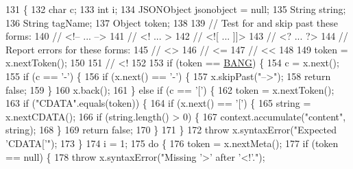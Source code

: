 \begin{DoxyCode}
131                                                                    \{
132         \textcolor{keywordtype}{char}       c;
133         \textcolor{keywordtype}{int}        i;
134         JSONObject jsonobject = null;
135         String     string;
136         String     tagName;
137         Object     token;
138 
139 \textcolor{comment}{// Test for and skip past these forms:}
140 \textcolor{comment}{//      <!-- ... -->}
141 \textcolor{comment}{//      <!   ...   >}
142 \textcolor{comment}{//      <![  ... ]]>}
143 \textcolor{comment}{//      <?   ...  ?>}
144 \textcolor{comment}{// Report errors for these forms:}
145 \textcolor{comment}{//      <>}
146 \textcolor{comment}{//      <=}
147 \textcolor{comment}{//      <<}
148 
149         token = x.nextToken();
150 
151 \textcolor{comment}{// <!}
152 
153         \textcolor{keywordflow}{if} (token == \hyperlink{classorg_1_1json_1_1_x_m_l_a15eadac312b9e5b2d8590be2d92cc24f}{BANG}) \{
154             c = x.next();
155             \textcolor{keywordflow}{if} (c == \textcolor{charliteral}{'-'}) \{
156                 \textcolor{keywordflow}{if} (x.next() == \textcolor{charliteral}{'-'}) \{
157                     x.skipPast(\textcolor{stringliteral}{"-->"});
158                     \textcolor{keywordflow}{return} \textcolor{keyword}{false};
159                 \}
160                 x.back();
161             \} \textcolor{keywordflow}{else} \textcolor{keywordflow}{if} (c == \textcolor{charliteral}{'['}) \{
162                 token = x.nextToken();
163                 \textcolor{keywordflow}{if} (\textcolor{stringliteral}{"CDATA"}.equals(token)) \{
164                     \textcolor{keywordflow}{if} (x.next() == \textcolor{charliteral}{'['}) \{
165                         \textcolor{keywordtype}{string} = x.nextCDATA();
166                         \textcolor{keywordflow}{if} (\textcolor{keywordtype}{string}.length() > 0) \{
167                             context.accumulate(\textcolor{stringliteral}{"content"}, \textcolor{keywordtype}{string});
168                         \}
169                         \textcolor{keywordflow}{return} \textcolor{keyword}{false};
170                     \}
171                 \}
172                 \textcolor{keywordflow}{throw} x.syntaxError(\textcolor{stringliteral}{"Expected 'CDATA['"});
173             \}
174             i = 1;
175             \textcolor{keywordflow}{do} \{
176                 token = x.nextMeta();
177                 \textcolor{keywordflow}{if} (token == null) \{
178                     \textcolor{keywordflow}{throw} x.syntaxError(\textcolor{stringliteral}{"Missing '>' after '<!'."});

\end{DoxyCode}
